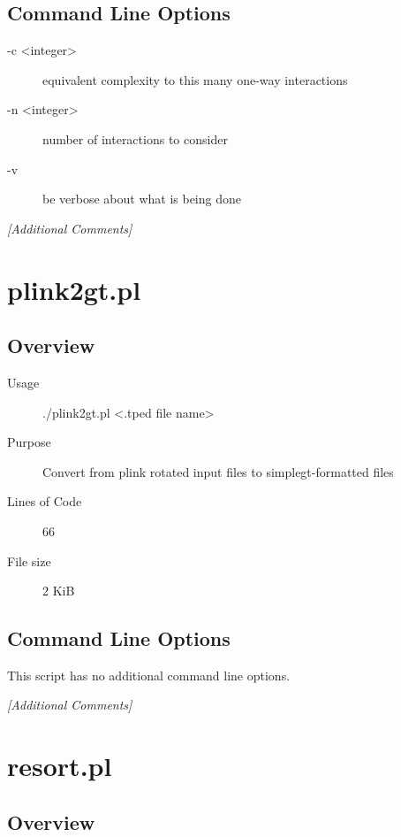 \subsection{Command Line Options}
\label{sec:nwayfilter.pl-command-line}

\begin{description}
\item[-c <integer>] equivalent complexity to this many one-way interactions
\item[-n <integer>] number of interactions to consider
\item[-v] be verbose about what is being done
\end{description}

\emph{[Additional Comments]}

\section{plink2gt.pl}
\label{sec:plink2gt.pl}

\subsection{Overview}
\label{sec:plink2gt.pl-overview}

\begin{description}
\item[Usage] ./plink2gt.pl <.tped file name>
\item[Purpose] Convert from plink rotated input files to simplegt-formatted files
\item[Lines of Code] 66
\item[File size] 2 KiB
\end{description}

\subsection{Command Line Options}
\label{sec:plink2gt.pl-command-line}

This script has no additional command line options.

\emph{[Additional Comments]}

\section{resort.pl}
\label{sec:resort.pl}

\subsection{Overview}
\label{sec:resort.pl-overview}

